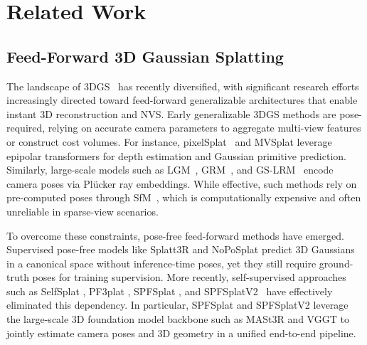 \documentclass[runningheads]{llncs}
\begin{document}
\section{Related Work}
\subsection{Feed-Forward 3D Gaussian Splatting}
The landscape of 3DGS~\cite{kerbl20233dgs} has recently diversified, with significant research efforts increasingly directed toward feed-forward generalizable architectures that enable instant 3D reconstruction and NVS.
Early generalizable 3DGS methods are pose-required, relying on accurate camera parameters to aggregate multi-view features or construct cost volumes. For instance, pixelSplat~\cite{charatan2024pixelsplat} and MVSplat \cite{chen2024mvsplat} leverage epipolar transformers for depth estimation and Gaussian primitive prediction. Similarly, large-scale models such as LGM~\cite{tang2024lgm}, GRM~\cite{xu2024grm}, and GS-LRM~\cite{zhang2024gs-lrm} encode camera poses via Pl\"ucker ray embeddings. While effective, such methods rely on pre-computed poses through SfM~\cite{schonberger2016sfmrevisited}, which is computationally expensive and often unreliable in sparse-view scenarios.

To overcome these constraints, pose-free feed-forward methods have emerged. Supervised pose-free models like Splatt3R \cite{smart2024splatt3r} and NoPoSplat \cite{ye2025noposplat} predict 3D Gaussians in a canonical space without inference-time poses, yet they still require ground-truth poses for training supervision. More recently, self-supervised approaches such as SelfSplat \cite{kang2025selfsplat}, PF3plat \cite{hong2025pf3plat}, SPFSplat \cite{huang2025spfsplat}, and SPFSplatV2~\cite{huang2025spfsplatv2} have effectively eliminated this dependency. In particular, SPFSplat and SPFSplatV2 leverage the large-scale 3D foundation model backbone such as MASt3R \cite{leroy2024mast3r} and VGGT \cite{wang2025vggt} to jointly estimate camera poses and 3D geometry in a unified end-to-end pipeline.

\end{document}

